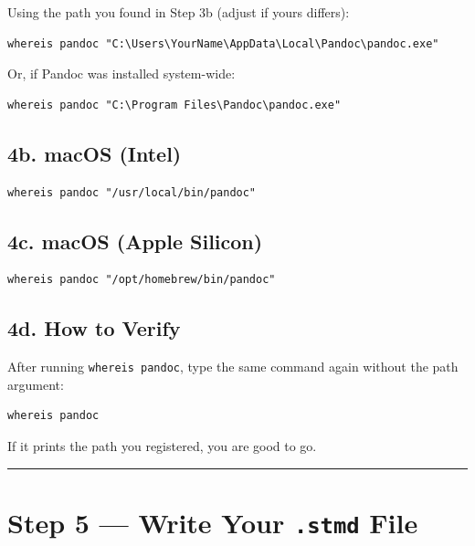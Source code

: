 \documentclass[paper=a4, fontsize=11pt]{scrartcl}
\newcommand{\horrule}[1]{\rule{\linewidth}{#1}}
\begin{document}
Using the path you found in Step 3b (adjust if yours differs):

\begin{lstlisting}[style=stata]
whereis pandoc "C:\Users\YourName\AppData\Local\Pandoc\pandoc.exe"
\end{lstlisting}

Or, if Pandoc was installed system-wide:

\begin{lstlisting}[style=stata]
whereis pandoc "C:\Program Files\Pandoc\pandoc.exe"
\end{lstlisting}

\subsection*{4b. macOS (Intel)}

\begin{lstlisting}[style=stata]
whereis pandoc "/usr/local/bin/pandoc"
\end{lstlisting}

\subsection*{4c. macOS (Apple Silicon)}

\begin{lstlisting}[style=stata]
whereis pandoc "/opt/homebrew/bin/pandoc"
\end{lstlisting}

\subsection*{4d. How to Verify}

After running \texttt{whereis pandoc}, type the same command again without the path
argument:

\begin{lstlisting}[style=stata]
whereis pandoc
\end{lstlisting}

If it prints the path you registered, you are good to go.

\bigskip\horrule{0.4pt}\bigskip

\section{Step 5 --- Write Your \texttt{.stmd} File}
\end{document}
